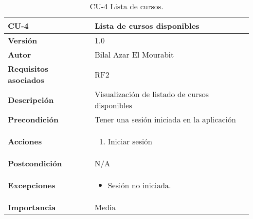 \begin{table}[H]
	\centering
	\begin{tabularx}{\linewidth}{ p{} p{} }
		\toprule
		\textbf{CU-4}    & \textbf{Lista de cursos disponibles}\\
		\toprule
		\textbf{Versión}              & 1.0    \\
		\textbf{Autor}                & Bilal Azar El Mourabit \\
		\textbf{Requisitos asociados} & RF2 \\
		\textbf{Descripción}          & Visualización de listado de cursos disponibles \\
    		\textbf{Precondición}         & Tener una sesión iniciada en la aplicación  \\
		\textbf{Acciones}             & 
		\begin{enumerate}
			\def\labelenumi{\arabic{enumi}.}
			\tightlist
			\item Iniciar sesión
		\end{enumerate}\\
		\textbf{Postcondición}        & N/A \\
		\textbf{Excepciones}          & \begin{itemize}
		    \item Sesión no iniciada.
		\end{itemize} \\
		\textbf{Importancia}          & Media \\
		\bottomrule
	\end{tabularx}
	\caption{CU-4 Lista de cursos.}
\end{table}

